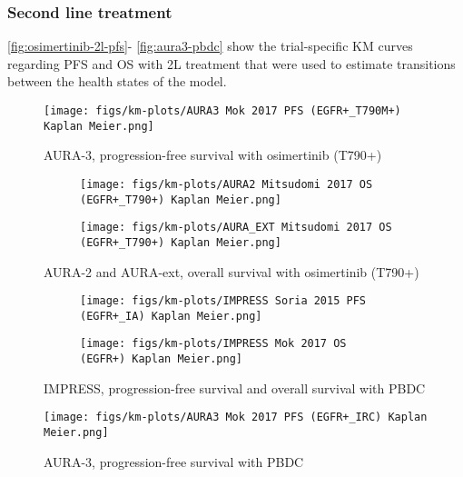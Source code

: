 \documentclass[11pt,final,fleqn]{article}\usepackage[]{graphicx}\usepackage[]{color}
\theoremstyle{plain}
\begin{document}
\begin{appendices}
\FloatBarrier

\subsubsection{Second line treatment}
\autoref{fig:osimertinib-2l-pfs}- \autoref{fig:aura3-pbdc} show the trial-specific KM curves regarding PFS and OS with 2L treatment that were used to estimate transitions between the health states of the model.

\begin{figure}
\centering
\texttt{[image: figs/km-plots/AURA3 Mok 2017 PFS (EGFR+\_T790M+) Kaplan Meier.png]}
\centering
\caption{AURA-3, progression-free survival with osimertinib (T790+)}\label{fig:osimertinib-2l-pfs}
\end{figure}

\begin{figure}
\centering
\begin{subfigure}{\textwidth}
\texttt{[image: figs/km-plots/AURA2 Mitsudomi 2017 OS (EGFR+\_T790+) Kaplan Meier.png]}
\end{subfigure}
\begin{subfigure}{\textwidth}
\texttt{[image: figs/km-plots/AURA\_EXT Mitsudomi 2017 OS (EGFR+\_T790+) Kaplan Meier.png]}
\end{subfigure}
\centering
\caption{AURA-2 and AURA-ext, overall survival with osimertinib (T790+)}\label{fig:osimertinib-2l-os}
\end{figure}


\begin{figure}
\centering
\begin{subfigure}{\textwidth}
\centering
\texttt{[image: figs/km-plots/IMPRESS Soria 2015 PFS (EGFR+\_IA) Kaplan Meier.png]}
\end{subfigure}
\begin{subfigure}{\textwidth}
\texttt{[image: figs/km-plots/IMPRESS Mok 2017 OS (EGFR+) Kaplan Meier.png]}
\end{subfigure}
\centering
\caption{IMPRESS, progression-free survival and overall survival with PBDC}\label{fig:Impress}
\end{figure}

\begin{figure}
\centering
\texttt{[image: figs/km-plots/AURA3 Mok 2017 PFS (EGFR+\_IRC) Kaplan Meier.png]}
\centering
\caption{AURA-3, progression-free survival with PBDC}\label{fig:aura3-pbdc}
\end{figure}


\end{appendices}
\end{document}
